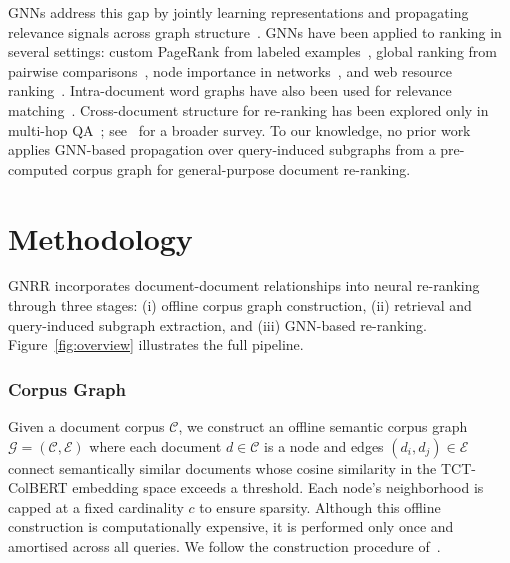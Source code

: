 \documentclass[runningheads]{llncs}
\newcommand{\ModelName}{GNRR\xspace}
\begin{document}
GNNs address this gap by jointly learning representations and propagating relevance signals across graph structure~\cite{messagepassing,everythingisconnected}. GNNs have been applied to ranking in several settings: custom PageRank from labeled examples~\cite{scarselli2005graph}, global ranking from pairwise comparisons~\cite{damke2021ranking,he2022gnnrank}, node importance in networks~\cite{liu2022learning,qu2023gnr}, and web resource ranking~\cite{ergashev2023learning}. Intra-document word graphs have also been used for relevance matching~\cite{graphofwords,graphofwords2}. Cross-document structure for re-ranking has been explored only in multi-hop QA~\cite{nie2021answeringanyhopopendomainquestions}; see~\cite{zaoad2025graphbasedrerankingemergingtechniques} for a broader survey. To our knowledge, no prior work applies GNN-based propagation over query-induced subgraphs from a pre-computed corpus graph for general-purpose document re-ranking.

\section{Methodology}
\label{sec:methodology}

\ModelName incorporates document-document relationships into neural re-ranking through three stages: (i) offline corpus graph construction, (ii) retrieval and query-induced subgraph extraction, and (iii) GNN-based re-ranking. Figure~\ref{fig:overview} illustrates the full pipeline.

\subsubsection*{\textbf{Corpus Graph}}
Given a document corpus $\mathcal{C}$, we construct an offline semantic corpus graph $\mathcal{G} = (\mathcal{C}, \mathcal{E})$ where each document $d \in \mathcal{C}$ is a node and edges $(d_i,d_j) \in \mathcal{E}$ connect semantically similar documents whose cosine similarity in the TCT-ColBERT embedding space exceeds a threshold. Each node's neighborhood is capped at a fixed cardinality $c$ to ensure sparsity. Although this offline construction is computationally expensive, it is performed only once and amortised across all queries.
We follow the construction procedure of~\cite{corpusgraph}.
\end{document}
